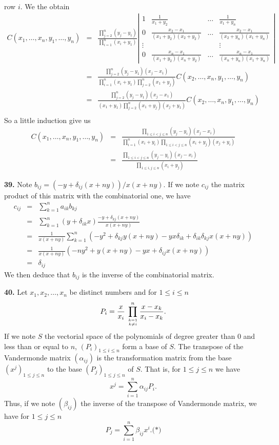 \documentclass[a4paper,12pt]{article}
\newcommand{\newpar}[1]{\bigskip \noindent \textbf{#1.}}
\begin{document}
row $i$.  We the obtain
\begin{eqnarray*}
  C(x_1, \ldots, x_n, y_1,\ldots,y_n) &=&
  \frac{\prod_{j=2}^n(y_j-y_1)}{\prod_{i=1}^n(x_i+y_1)} \left|
  \begin{array}{cccc}
    1 & \frac{1}{x_1+y_2} & \ldots & \frac{1}{x_1+y_n} \\
    0 & \frac{x_2-x_1}{(x_1+y_2)(x_2+y_2)} & \ldots &
    \frac{x_2-x_1}{(x_2+y_n)(x_1+y_n)} \\
    \vdots & & & \vdots \\
    0 & \frac{x_n-x_1}{(x_1+y_2)(x_n+y_2)} & \ldots &
    \frac{x_n-x_1}{(x_n+y_n)(x_1+y_n)}
  \end{array} \right| \\
  &=&\frac{\prod_{j=2}^n(y_j-y_1)(x_j-x_1)}{\prod_{i=1}^n(x_i+y_1)
    \prod_{j=2}^n(x_1+y_j)} C(x_2, \ldots, x_n, y_1, \ldots, y_n) \\
  &=& \frac{\prod_{j=2}^n(y_j-y_1)(x_j-x_1)}{(x_1+y_1)
    \prod_{j=2}^n(x_1+y_j)(x_j+y_1)} C(x_2, \ldots, x_n, y_1, \ldots, y_n) \\
\end{eqnarray*}
So a little induction give us
\begin{eqnarray*}
  C(x_1,\ldots,x_n,y_1,\ldots,y_n) &=&
  \frac{\prod_{1\le i <j \le n}(y_j-y_i)(x_j-x_i)}{\prod_{i=1}^n(x_i+y_i)
    \prod_{1\le i<j\le n}(x_i+y_j)(x_j+y_i)} \\
  &=& \frac{\prod_{1\le i<j\le n}(y_j-y_i)(x_j-x_i)}
       {\prod_{1\le i,j\le n}(x_i+y_j)}
\end{eqnarray*}

\newpar{39}  Note $b_{ij} = (-y + \delta_{ij}(x+ny))/x(x+ny)$.  If we
note $c_{ij}$ the matrix product of this matrix with the combinatorial
one, we have
\begin{eqnarray*}
  c_{ij} &=& \sum_{k=1}^na_{ik}b_{kj} \\
  &=& \sum_{k=1}^n (y + \delta_{ik}x)
  \frac{-y + \delta_{kj}(x+ny)}{x(x+ny)} \\
  &=& \frac{1}{x(x+ny)}
  \sum_{k=1}^n\left(-y^2 + \delta_{kj}y(x+ny)
  - yx\delta_{ik} + \delta_{ik}\delta_{kj}x(x+ny)\right) \\
  &=& \frac{1}{x(x+ny)}
  \left(-ny^2 + y(x+ny) - yx + \delta_{ij}x(x+ny)\right) \\
  &=& \delta_{ij}
\end{eqnarray*}
We then deduce that $b_{ij}$ is the inverse of the combinatorial
matrix.

\newpar{40}  Let  $x_1,x_2,\ldots,x_n$ be distinct numbers and for
$1\le i\le n$
\[ P_i = \frac{x}{x_i}\,\prod_{k=1\atop
  k\not=i}^n\frac{x-x_k}{x_i-x_k}.\]
If we note $S$ the vectorial space of the polynomials of degree
greater than $0$ and less than or equal to $n$, $(P_i)_{1\le i\le n}$
form a base of $S$.  The transpose of the Vandermonde matrix $(\alpha_{ij})$ is
the transformation matrix from the base $(x^j)_{1\le j\le n}$ to the base
$(P_j)_{1\le j\le n}$ of $S$.  That is, for $1\le j\le n$ we have
\[ x^j = \sum_{i=1}^n \alpha_{ij}P_i.\]
Thus, if we note $(\beta_{ij})$ the inverse of the transpose of
Vandermonde matrix, we have for $1\le j\le n$
\[ P_j = \sum_{i=1}^n \beta_{ij}x^i.\mbox{(*)}\]
\end{document}
